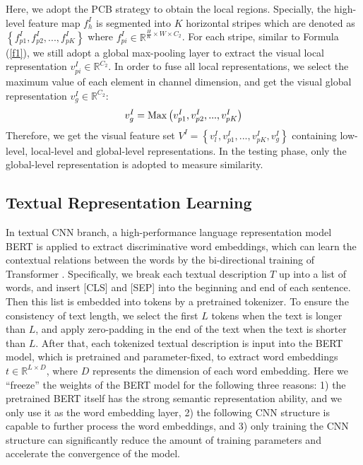 \documentclass[review]{elsarticle}
\begin{document}
Here, we adopt the PCB \cite{2} strategy to obtain the local regions. Specially, the high-level feature map $f_h^I$ is segmented into $K$ horizontal stripes which are denoted as $\left\{ {f_{p1}^I,f_{p2}^I,...,f_{pK}^I} \right\}$ where $f_{pi}^I \in {\mathbb{R}^{\frac{H}{K} \times W \times {C_2}}}$. For each stripe, similar to Formula (\ref{f1}), we still adopt a global max-pooling layer to extract the visual local representation $v_{pi}^I \in {\mathbb{R}^{{C_2}}}$. In order to fuse all local representations, we select the maximum value of each element in channel dimension, and get the visual global representation $v_g^I \in {\mathbb{R}^{{C_2}}}$:
\begin{equation}
    v_g^I = {\rm{Max}}\left( {v_{p1}^I,v_{p2}^I,...,v_{pK}^I} \right)
\label{f2}
\end{equation}
Therefore, we get the visual feature set ${V^I} = \left\{ {v_l^I,v_{p1}^I,...,v_{pK}^I,v_g^I} \right\}$ containing low-level, local-level and global-level representations. In the testing phase, only the global-level representation is adopted to measure similarity.

\subsection{Textual Representation Learning}
In textual CNN branch, a high-performance language representation model BERT \cite{26} is applied to extract discriminative word embeddings, which can learn the contextual relations between the words by the bi-directional training of Transformer \cite{49}. Specifically, we break each textual description $T$ up into a list of words, and insert [CLS] and [SEP] into the beginning and end of each sentence. Then this list is embedded into tokens by a pretrained tokenizer. To ensure the consistency of text length, we select the first $L$ tokens when the text is longer than $L$, and apply zero-padding in the end of the text when the text is shorter than $L$. After that, each tokenized textual description is input into the BERT model, which is pretrained and parameter-fixed, to extract word embeddings $t \in {\mathbb{R}^{L \times D}}$, where $D$ represents the dimension of each word embedding. Here we “freeze” the weights of the BERT model for the following three reasons: 1) the pretrained BERT itself has the strong semantic representation ability, and we only use it as the word embedding layer, 2) the following CNN structure is capable to further process the word embeddings, and 3) only training the CNN structure can significantly reduce the amount of training parameters and accelerate the convergence of the model.
\end{document}
